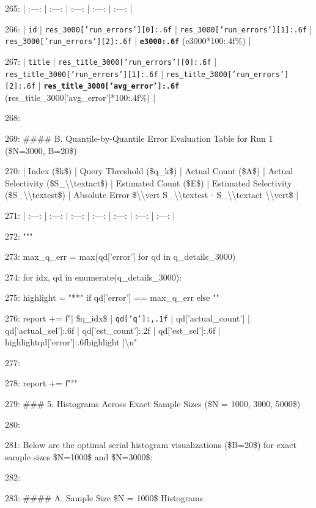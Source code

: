 \documentclass[11pt,a4paper]{article}
\begin{document}
265: | :---: | :---: | :---: | :---: | :---: |

266: | \texttt{id} | \texttt{{res\_3000['run\_errors'][0]:.6f}} | \texttt{{res\_3000['run\_errors'][1]:.6f}} | \texttt{{res\_3000['run\_errors'][2]:.6f}} | \textbf{\texttt{{e3000:.6f}}} ({e3000*100:.4f}\%) |

267: | \texttt{title} | \texttt{{res\_title\_3000['run\_errors'][0]:.6f}} | \texttt{{res\_title\_3000['run\_errors'][1]:.6f}} | \texttt{{res\_title\_3000['run\_errors'][2]:.6f}} | \textbf{\texttt{{res\_title\_3000['avg\_error']:.6f}}} ({res\_title\_3000['avg\_error']*100:.4f}\%) |

268:

269: \#\#\#\# B. Quantile-by-Quantile Error Evaluation Table for Run 1 (\$N=3000, B=20\$)

270: | Index (\$k\$) | Query Threshold (\$q\_k\$) | Actual Count (\$A\$) | Actual Selectivity (\$S\_{{\textbackslash{}\textbackslash{}text{{act}}}}\$) | Estimated Count (\$E\$) | Estimated Selectivity (\$S\_{{\textbackslash{}\textbackslash{}text{{est}}}}\$) | Absolute Error \$\textbackslash{}\textbackslash{}vert S\_{{\textbackslash{}\textbackslash{}text{{est}}}} - S\_{{\textbackslash{}\textbackslash{}text{{act}}}} \textbackslash{}\textbackslash{}vert\$ |

271: | :---: | :---: | :---: | :---: | :---: | :---: | :---: |

272: """

273:     max\_q\_err = max(qd['error'] for qd in q\_details\_3000)

274:     for idx, qd in enumerate(q\_details\_3000):

275:         highlight = "**" if qd['error'] == max\_q\_err else ""

276:         report += f"| \$q\_{{{idx}}}\$ | \texttt{{qd['q']:,.1f}} | {qd['actual\_count']} | {qd['actual\_sel']:.6f} | {qd['est\_count']:.2f} | {qd['est\_sel']:.6f} | {highlight}{qd['error']:.6f}{highlight} |\textbackslash{}n"

277:

278:     report += f"""

279: \#\#\# 5. Histograms Across Exact Sample Sizes (\$N = 1000, 3000, 5000\$)

280:

281: Below are the optimal serial histogram visualizations (\$B=20\$) for exact sample sizes \$N=1000\$ and \$N=3000\$:

282:

283: \#\#\#\# A. Sample Size \$N = 1000\$ Histograms
\end{document}
